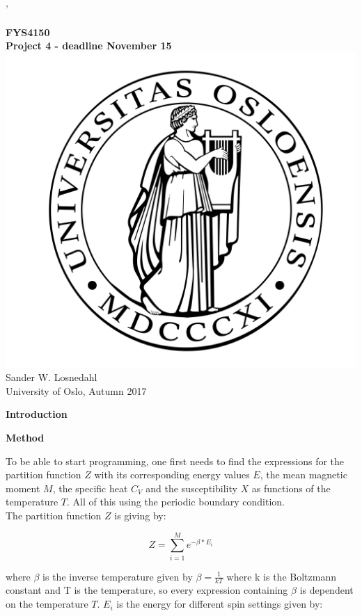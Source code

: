 \documentclass[10pt,a4paper]{article}
\begin{document}
'
\begin{center}
{\LARGE\bf
FYS4150\\
Project 4 - deadline November 15
}
\\
 \includegraphics[scale=0.1]{uio.png}\\
Sander W. Losnedahl\\
University of Oslo, Autumn 2017
 
\end{center}
\newpage

\begin{center}
{\LARGE\bf Introduction}
\end{center}

\newpage

\begin{center}
{\LARGE\bf Method}
\end{center}

\noindent To be able to start programming, one first needs to find the expressions for the partition function $Z$ with its corresponding energy values $E$, the mean magnetic moment $M$, the specific heat $C_V$ and the susceptibility $X$ as functions of the temperature $T$. All of this using the periodic boundary condition.
\\
The partition function $Z$ is giving by: 


$$
Z = \sum^{M}_{i = 1} e^{-\beta * E_i}
$$ 

\noindent where $\beta$ is the inverse temperature given by $\beta = \frac{1}{kT}$ where k is the Boltzmann constant and T is the temperature, so every expression containing $\beta$ is dependent on the temperature $T$. $E_i$ is the energy for different spin settings given by:
\end{document}
